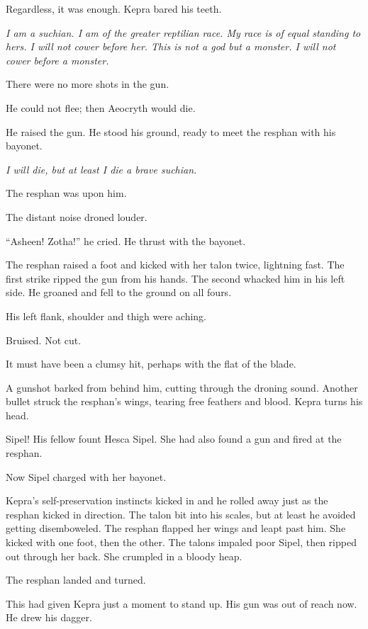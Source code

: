 \documentclass
  [a4paper,
   12pt,
   oneside
  ]%
  {article}
\begin{document}
Regardless, it was enough. Kepra bared his teeth. 

\emph{I am a suchian. I am of the greater reptilian race. My race is of equal standing to hers. I will not cower before her. This is not a god but a monster. I will not cower before a monster.}

There were no more shots in the gun. 

He could not flee; then Aeocryth would die. 

He raised the gun. He stood his ground, ready to meet the resphan with his bayonet. 

\emph{I will die, but at least I die a brave suchian.} 

The resphan was upon him.

The distant noise droned louder.

``Asheen! Zotha!'' he cried. He thrust with the bayonet.

The resphan raised a foot and kicked with her talon twice, lightning fast. 
The first strike ripped the gun from his hands. 
The second whacked him in his left side. He groaned and fell to the ground on all fours. 

His left flank, shoulder and thigh were aching. 

Bruised. Not cut. 

It must have been a clumsy hit, perhaps with the flat of the blade. 

A gunshot barked from behind him, cutting through the droning sound. 
Another bullet struck the resphan’s wings, tearing free feathers and blood. 
Kepra turns his head. 

Sipel! His fellow fount Hesca Sipel. She had also found a gun and fired at the resphan.

Now Sipel charged with her bayonet. 

Kepra's self-preservation instincts kicked in and he rolled away just as the resphan kicked in direction. 
The talon bit into his scales, but at least he avoided getting disemboweled.
The resphan flapped her wings and leapt past him. 
She kicked with one foot, then the other.
The talons impaled poor Sipel, then ripped out through her back. 
She crumpled in a bloody heap.

The resphan landed and turned. 

This had given Kepra just a moment to stand up. His gun was out of reach now. He drew his dagger. 
\end{document}
